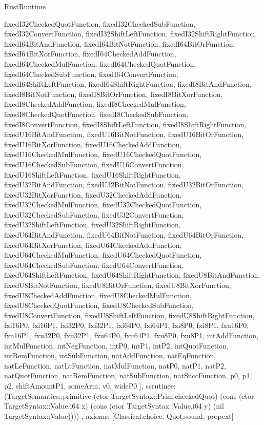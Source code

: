 \begin{lexlean}{RustRuntime}
\begin{semanticmodule}
{{      fixedI32CheckedQuotFunction,
      fixedI32CheckedSubFunction,
      fixedI32ConvertFunction,
      fixedI32ShiftLeftFunction,
      fixedI32ShiftRightFunction,
      fixedI64BitAndFunction,
      fixedI64BitNotFunction,
      fixedI64BitOrFunction,
      fixedI64BitXorFunction,
      fixedI64CheckedAddFunction,
      fixedI64CheckedMulFunction,
      fixedI64CheckedQuotFunction,
      fixedI64CheckedSubFunction,
      fixedI64ConvertFunction,
      fixedI64ShiftLeftFunction,
      fixedI64ShiftRightFunction,
      fixedI8BitAndFunction,
      fixedI8BitNotFunction,
      fixedI8BitOrFunction,
      fixedI8BitXorFunction,
      fixedI8CheckedAddFunction,
      fixedI8CheckedMulFunction,
      fixedI8CheckedQuotFunction,
      fixedI8CheckedSubFunction,
      fixedI8ConvertFunction,
      fixedI8ShiftLeftFunction,
      fixedI8ShiftRightFunction,
      fixedU16BitAndFunction,
      fixedU16BitNotFunction,
      fixedU16BitOrFunction,
      fixedU16BitXorFunction,
      fixedU16CheckedAddFunction,
      fixedU16CheckedMulFunction,
      fixedU16CheckedQuotFunction,
      fixedU16CheckedSubFunction,
      fixedU16ConvertFunction,
      fixedU16ShiftLeftFunction,
      fixedU16ShiftRightFunction,
      fixedU32BitAndFunction,
      fixedU32BitNotFunction,
      fixedU32BitOrFunction,
      fixedU32BitXorFunction,
      fixedU32CheckedAddFunction,
      fixedU32CheckedMulFunction,
      fixedU32CheckedQuotFunction,
      fixedU32CheckedSubFunction,
      fixedU32ConvertFunction,
      fixedU32ShiftLeftFunction,
      fixedU32ShiftRightFunction,
      fixedU64BitAndFunction,
      fixedU64BitNotFunction,
      fixedU64BitOrFunction,
      fixedU64BitXorFunction,
      fixedU64CheckedAddFunction,
      fixedU64CheckedMulFunction,
      fixedU64CheckedQuotFunction,
      fixedU64CheckedSubFunction,
      fixedU64ConvertFunction,
      fixedU64ShiftLeftFunction,
      fixedU64ShiftRightFunction,
      fixedU8BitAndFunction,
      fixedU8BitNotFunction,
      fixedU8BitOrFunction,
      fixedU8BitXorFunction,
      fixedU8CheckedAddFunction,
      fixedU8CheckedMulFunction,
      fixedU8CheckedQuotFunction,
      fixedU8CheckedSubFunction,
      fixedU8ConvertFunction,
      fixedU8ShiftLeftFunction,
      fixedU8ShiftRightFunction,
      fxi16P0,
      fxi16P1,
      fxi32P0,
      fxi32P1,
      fxi64P0,
      fxi64P1,
      fxi8P0,
      fxi8P1,
      fxu16P0,
      fxu16P1,
      fxu32P0,
      fxu32P1,
      fxu64P0,
      fxu64P1,
      fxu8P0,
      fxu8P1,
      intAddFunction,
      intMulFunction,
      intNegFunction,
      intP0,
      intP1,
      intP2,
      intQuotFunction,
      intRemFunction,
      intSubFunction,
      natAddFunction,
      natEqFunction,
      natLeFunction,
      natLtFunction,
      natMulFunction,
      natP0,
      natP1,
      natP2,
      natQuotFunction,
      natRemFunction,
      natSubFunction,
      natSuccFunction,
      p0,
      p1,
      p2,
      shiftAmountP1,
      someArm,
      v0,
      wideP0
    ],
    scrutinee: (TargetSemantics::primitive (ctor TargetSyntax::Prim.checkedQuot) (cons (ctor TargetSyntax::Value.i64 x) (cons (ctor TargetSyntax::Value.i64 y) (nil TargetSyntax::Value))))
  },
  axioms: [Classical.choice, Quot.sound, propext]
}


\end{semanticmodule}
\end{lexlean}
